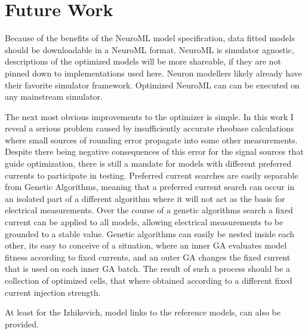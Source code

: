 \section{Future Work}
Because of the benefits of the NeuroML model specification, data fitted models should be downloadable in a NeuroML format. NeuroML is simulator agnostic, descriptions of the optimized models will be more shareable, if they are not pinned down to implementations used here. Neuron modellers likely already have their favorite simulator framework. Optimized NeuroML can can be executed on any mainstream simulator. 

The next most obvious improvements to the optimizer is simple. In this work I reveal a serious problem caused by insufficiently accurate rheobase calculations where small sources of rounding error  propagate into some other measurements. %
Despite there being negative consequences of this error for the signal sources that guide optimization, there is still a mandate for models with different preferred currents to participate in testing. Preferred current searches are easily separable from Genetic Algorithms, meaning that a preferred current search can occur in an isolated part of a different algorithm where it will not act as the basis for electrical measurements. Over the course of a genetic algorithms search a fixed current can be applied to all models, allowing electrical measurements to be grounded to a stable value. Genetic algorithms can easily be nested inside each other, its easy to conceive of a situation, where an inner GA evaluates model fitness according to fixed currents, and an outer GA changes the fixed current that is used on each inner GA batch. The result of such a process should be a collection of optimized cells, that where obtained according to a different fixed current injection strength. %


At least for the Izhikevich, model links to the reference models, can also be provided.